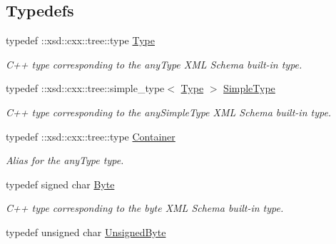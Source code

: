 \subsection*{Typedefs}
\begin{DoxyCompactItemize}
\item 
\hypertarget{namespacexml__schema_ad34e8fd175bf4f9fece6c670b01aa239}{
typedef ::xsd::cxx::tree::type \hyperlink{namespacexml__schema_ad34e8fd175bf4f9fece6c670b01aa239}{Type}}
\label{namespacexml__schema_ad34e8fd175bf4f9fece6c670b01aa239}

\begin{DoxyCompactList}\small\item\em C++ type corresponding to the anyType XML Schema built-\/in type. \item\end{DoxyCompactList}\item 
\hypertarget{namespacexml__schema_a1171be9b6e593e49b895a46671f5dc5f}{
typedef ::xsd::cxx::tree::simple\_\-type$<$ \hyperlink{namespacexml__schema_ad34e8fd175bf4f9fece6c670b01aa239}{Type} $>$ \hyperlink{namespacexml__schema_a1171be9b6e593e49b895a46671f5dc5f}{SimpleType}}
\label{namespacexml__schema_a1171be9b6e593e49b895a46671f5dc5f}

\begin{DoxyCompactList}\small\item\em C++ type corresponding to the anySimpleType XML Schema built-\/in type. \item\end{DoxyCompactList}\item 
\hypertarget{namespacexml__schema_a333dea2213742aea47a37532dec4ec27}{
typedef ::xsd::cxx::tree::type \hyperlink{namespacexml__schema_a333dea2213742aea47a37532dec4ec27}{Container}}
\label{namespacexml__schema_a333dea2213742aea47a37532dec4ec27}

\begin{DoxyCompactList}\small\item\em Alias for the anyType type. \item\end{DoxyCompactList}\item 
\hypertarget{namespacexml__schema_a1b7c2d8f9fdcd7812acdfc885225e06e}{
typedef signed char \hyperlink{namespacexml__schema_a1b7c2d8f9fdcd7812acdfc885225e06e}{Byte}}
\label{namespacexml__schema_a1b7c2d8f9fdcd7812acdfc885225e06e}

\begin{DoxyCompactList}\small\item\em C++ type corresponding to the byte XML Schema built-\/in type. \item\end{DoxyCompactList}\item 
\hypertarget{namespacexml__schema_a395b3a9628b056f70930e3294e622b7c}{
typedef unsigned char \hyperlink{namespacexml__schema_a395b3a9628b056f70930e3294e622b7c}{UnsignedByte}}
\label{namespacexml__schema_a395b3a9628b056f70930e3294e622b7c}


\end{DoxyCompactItemize}
